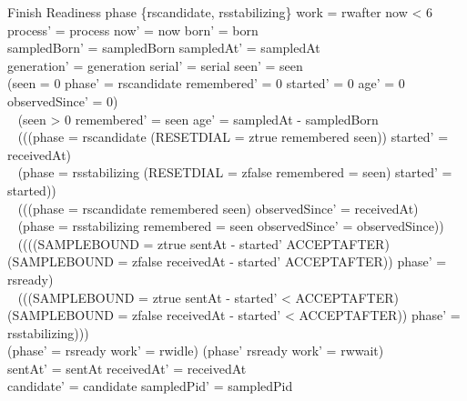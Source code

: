 \documentclass[a4paper,10pt,fleqn]{article}
\begin{document}
\begin{schema}{Finish}
  \Delta Readiness
\where
  phase \in \{rscandidate, rsstabilizing\} \land work = rwafter \land now < 6 \\
  process' = process \land now' = now \land born' = born \\
  sampledBorn' = sampledBorn \land sampledAt' = sampledAt \\
  generation' = generation \land serial' = serial \land seen' = seen \\
  (seen = 0 \land phase' = rscandidate \land remembered' = 0
    \land started' = 0 \land age' = 0 \land observedSince' = 0) \\
  \quad~ \lor (seen > 0 \land remembered' = seen
    \land age' = sampledAt - sampledBorn \\
  \quad~ \land (((phase = rscandidate \lor
    (RESETDIAL = ztrue \land remembered \neq seen))
    \land started' = receivedAt) \\
  \quad~ \lor (phase = rsstabilizing \land
    (RESETDIAL = zfalse \lor remembered = seen) \land started' = started)) \\
  \quad~ \land (((phase = rscandidate \lor remembered \neq seen)
    \land observedSince' = receivedAt) \\
  \quad~ \lor (phase = rsstabilizing \land remembered = seen
    \land observedSince' = observedSince)) \\
  \quad~ \land ((((SAMPLEBOUND = ztrue \land sentAt - started' \geq ACCEPTAFTER)
    \lor (SAMPLEBOUND = zfalse \land receivedAt - started' \geq ACCEPTAFTER))
    \land phase' = rsready) \\
  \quad~ \lor (((SAMPLEBOUND = ztrue \land sentAt - started' < ACCEPTAFTER)
    \lor (SAMPLEBOUND = zfalse \land receivedAt - started' < ACCEPTAFTER))
    \land phase' = rsstabilizing))) \\
  (phase' = rsready \land work' = rwidle) \lor
    (phase' \neq rsready \land work' = rwwait) \\
  sentAt' = sentAt \land receivedAt' = receivedAt \\
  candidate' = candidate \land sampledPid' = sampledPid
\end{schema}
\end{document}
